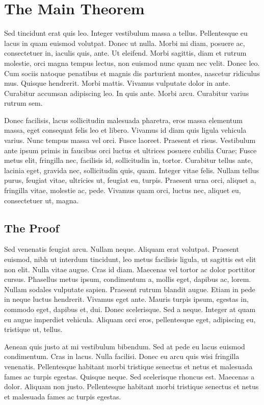 \documentclass[showtrims]{kth-mag}
\begin{document}
\section{The Main Theorem}

Sed tincidunt erat quis leo. Integer vestibulum massa a tellus.
Pellentesque eu lacus in quam euismod volutpat. Donec ut nulla. Morbi
mi diam, posuere ac, consectetuer in, iaculis quis, ante. Ut eleifend.
Morbi sagittis, diam et rutrum molestie, orci magna tempus lectus, non
euismod nunc quam nec velit. Donec leo. Cum sociis natoque penatibus
et magnis dis parturient montes, nascetur ridiculus mus. Quisque
hendrerit. Morbi mattis. Vivamus vulputate dolor in ante. Curabitur
accumsan adipiscing leo. In quis ante. Morbi arcu. Curabitur varius
rutrum sem.

Donec facilisis, lacus sollicitudin malesuada pharetra, eros massa
elementum massa, eget consequat felis leo et libero. Vivamus id diam
quis ligula vehicula varius. Nunc tempus massa vel orci. Fusce
laoreet. Praesent et risus. Vestibulum ante ipsum primis in faucibus
orci luctus et ultrices posuere cubilia Curae; Fusce metus elit,
fringilla nec, facilisis id, sollicitudin in, tortor. Curabitur tellus
ante, lacinia eget, gravida nec, sollicitudin quis, quam. Integer
vitae felis. Nullam tellus purus, feugiat vitae, ultricies ut, feugiat
eu, turpis. Praesent urna orci, aliquet a, fringilla vitae, molestie
ac, pede. Vivamus quam orci, luctus nec, aliquet eu, consectetuer ut,
magna.

\subsection{The Proof}

Sed venenatis feugiat arcu. Nullam neque. Aliquam erat volutpat.
Praesent euismod, nibh ut interdum tincidunt, leo metus facilisis
ligula, ut sagittis est elit non elit. Nulla vitae augue. Cras id
diam. Maecenas vel tortor ac dolor porttitor cursus. Phasellus metus
ipsum, condimentum a, mollis eget, dapibus ac, lorem. Nullam sodales
vulputate sapien. Praesent rutrum blandit augue. Etiam in pede in
neque luctus hendrerit. Vivamus eget ante. Mauris turpis ipsum,
egestas in, commodo eget, dapibus et, dui. Donec scelerisque. Sed a
neque. Integer at quam eu augue imperdiet vehicula. Aliquam orci eros,
pellentesque eget, adipiscing eu, tristique ut, tellus.

Aenean quis justo at mi vestibulum bibendum. Sed at pede eu lacus
euismod condimentum. Cras in lacus. Nulla facilisi. Donec eu arcu quis
wisi fringilla venenatis. Pellentesque habitant morbi tristique
senectus et netus et malesuada fames ac turpis egestas. Quisque neque.
Sed scelerisque rhoncus est. Maecenas a dolor. Aliquam non justo.
Pellentesque habitant morbi tristique senectus et netus et malesuada
fames ac turpis egestas.
\end{document}
